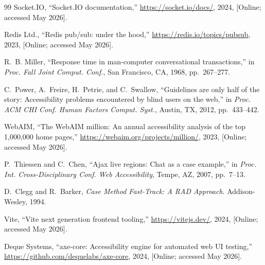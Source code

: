 \documentclass[conference]{IEEEtran}
\begin{document}
\begin{thebibliography}{99}
Socket.IO, ``Socket.IO documentation,''
\url{https://socket.io/docs/}, 2024, [Online; accessed May 2026].

Redis Ltd., ``Redis pub/sub: under the hood,''
\url{https://redis.io/topics/pubsub}, 2023,
[Online; accessed May 2026].

R.~B. Miller,
``Response time in man-computer conversational transactions,''
in \textit{Proc. Fall Joint Comput. Conf.}, San Francisco, CA, 1968,
pp.~267--277.

C.~Power, A.~Freire, H.~Petrie, and C.~Swallow,
``Guidelines are only half of the story: Accessibility problems
encountered by blind users on the web,''
in \textit{Proc. ACM CHI Conf. Human Factors Comput. Syst.},
Austin, TX, 2012, pp.~433--442.

WebAIM, ``The WebAIM million: An annual accessibility analysis of
the top 1,000,000 home pages,''
\url{https://webaim.org/projects/million/}, 2023,
[Online; accessed May 2026].

P.~Thiessen and C.~Chen,
``Ajax live regions: Chat as a case example,''
in \textit{Proc. Int. Cross-Disciplinary Conf. Web Accessibility},
Tempe, AZ, 2007, pp.~7--13.

D.~Clegg and R.~Barker,
\textit{Case Method Fast-Track: A RAD Approach}.
Addison-Wesley, 1994.

Vite, ``Vite next generation frontend tooling,''
\url{https://vitejs.dev/}, 2024, [Online; accessed May 2026].

Deque Systems, ``axe-core: Accessibility engine for automated web
UI testing,''
\url{https://github.com/dequelabs/axe-core}, 2024,
[Online; accessed May 2026].

\end{thebibliography}
\end{document}
